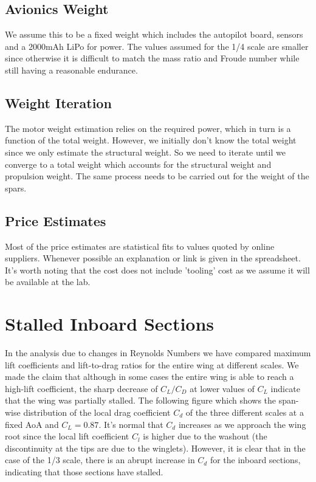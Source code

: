 \documentclass[titlepage,10pt]{article}
\begin{document}
\subsection{Avionics Weight}
We assume this to be a fixed weight which includes the autopilot board, sensors and a 2000mAh LiPo for power. The values assumed for the 1/4 scale are smaller since otherwise it is difficult to match the mass ratio and Froude number while still having a reasonable endurance.


\subsection{Weight Iteration}
The motor weight estimation relies on the required power, which in turn is a function of the total weight. However, we initially don't know the total weight since we only estimate the structural weight. So we need to iterate until we converge to a total weight which accounts for the structural weight and propulsion weight. The same process needs to be carried out for the weight of the spars.

\subsection{Price Estimates}
Most of the price estimates are statistical fits to values quoted by online suppliers. Whenever possible an explanation or link is given in the spreadsheet. It's worth noting that the cost does not include 'tooling' cost as we assume it will be available at the lab.


\newpage	
\section{Stalled Inboard Sections}
\label{app:stalled}
In the analysis due to changes in Reynolds Numbers we have compared maximum lift coefficients and lift-to-drag ratios for the entire wing at different scales. We made the claim that although in some cases the entire wing is able to reach a high-lift coefficient, the sharp decrease of $C_L/C_D$ at lower values of $C_L$ indicate that the wing was partially stalled. The following figure which shows the span-wise distribution of the local drag coefficient $C_d$ of the three different scales at a fixed AoA and $C_L=0.87$. It's normal that $C_d$ increases as we approach the wing root since the local lift coefficient $C_l$ is higher due to the washout (the discontinuity at the tips are due to the winglets). However, it is clear that in the case of the 1/3 scale, there is an abrupt increase in $C_d$ for the inboard sections, indicating that those sections have stalled.
\end{document}
